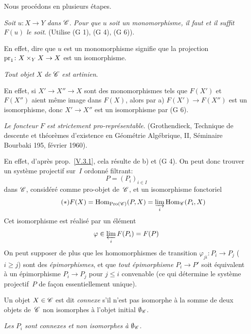 Nous proc\'edons en plusieurs \'etapes.
\begin{enumerateb}
\item[a)] \emph{Soit} $u \colon X \to Y$ \emph{dans}
$\cal{C}$. \emph{Pour que} $u$ \emph{soit un monomorphisme, il faut et
il suffit} $F(u)$ \emph{le soit}. (Utilise (G 1), (G 4), (G 6)).

En effet, dire que $u$ est un monomorphisme signifie que la projection
$\pr_1 \colon X \times_Y X \to X$ est un isomorphisme.

\item[b)] \emph{Tout objet} $X$ \emph{de} $\cal{C}$ \emph{est
artinien}.

En effet, si $X' \to X'' \to X$ sont des monomorphismes tels que
$F(X')$ et $F(X'')$ aient m\^eme image dans $F(X)$, alors par a)
$F(X') \to F(X'')$ est un isomorphisme, donc $X' \to X''$ est un
isomorphisme par (G 6).

\item[c)] \emph{Le foncteur} $F$ \emph{est strictement
pro-représentable}. (\cf Grothendieck, Technique de descente et
th\'eor\`emes d'existence en G\'eom\'etrie Alg\'ebrique, II,
S\'eminaire Bourbaki 195, f\'evrier 1960).

En effet, d'apr\`es \loccit prop.\, \ref{V.3.1}, cela r\'esulte de
b) et (G 4). On peut donc trouver un syst\`eme projectif sur~$I$
ordonn\'e filtrant:
$$
P=(P_i)_{i \in I}
$$
dans $\cal{C}$, consid\'er\'e comme pro-objet de~$\cal{C}$, et un
isomorphisme fonctoriel
\begin{equation*}
\label{eq:V.4.*} \tag{$*$} F(X)=\Hom_{\Pro(\cal{C})}(P,X)=\varinjlim_{i} \Hom_{\cal{C}}(P_i,X)
\end{equation*}
Cet isomorphisme est r\'ealis\'e par un \'el\'ement
$$
\varphi \in \varprojlim_{i} F(P_i)=F(P)
$$
On peut supposer de plus que les homomorphismes de transition
$\varphi_{ji} \colon P_i \to P_j$ ($i \geq j$) sont des
\emph{épimorphismes}, et que \emph{tout épimorphisme} $P_i \to
P'$ soit \'equivalent \`a un \'epimorphisme $P_i \to P_j$ pour
$j \leq i$ convenable (ce qui d\'etermine le syst\`eme projectif~$P$ de fa\c con essentiellement unique).

Un objet $X \in \cal{C}$ est dit \emph{connexe}
s'il n'est pas isomorphe \`a la somme de deux objets de~$\cal{C}$
non isomorphes \`a l'objet initial $\emptyset_{\cal{C}}$.

\item[d)] \emph{Les} $P_i$ \emph{sont connexes et non isomorphes
à} $\emptyset_{\cal{C}}$.


\end{enumerateb}
